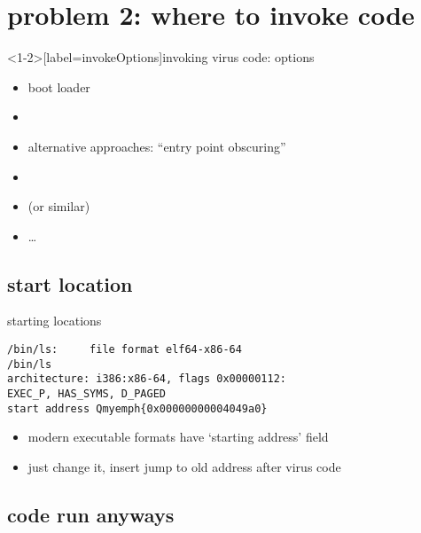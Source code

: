 \begin{frame}{}
\end{frame}

\section{problem 2: where to invoke code}


\begin{frame}<1-2>[label=invokeOptions]{invoking virus code: options}
    \begin{itemize}
    \item boot loader
    \item {} 
    \item alternative approaches: ``entry point obscuring''
    \item {}
    \item {} (or similar)
    \item \ldots
    \end{itemize}
\end{frame}

\subsection{start location}

\begin{frame}[fragile,label=invokeStarting]{starting locations}
\begin{Verbatim}[fontsize=\fontsize{10}{11}\selectfont,commandchars=Q\{\}]
/bin/ls:     file format elf64-x86-64
/bin/ls
architecture: i386:x86-64, flags 0x00000112:
EXEC_P, HAS_SYMS, D_PAGED
start address Qmyemph{0x00000000004049a0}
\end{Verbatim}
    \begin{itemize}
    \item modern executable formats have `starting address' field
    \item just change it, insert jump to old address after virus code
    \end{itemize}
\end{frame}


\subsection{code run anyways}

